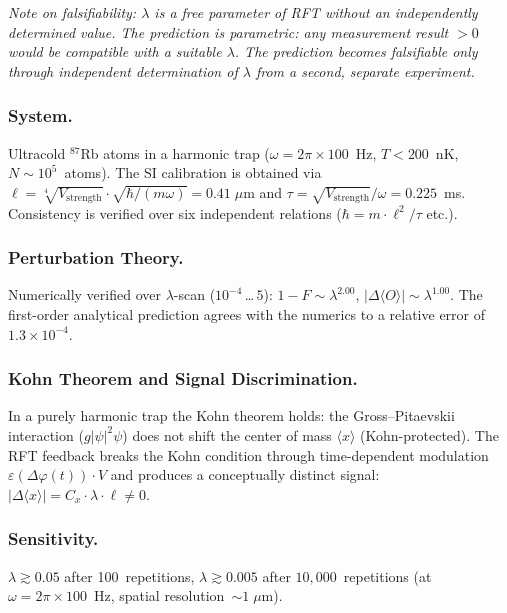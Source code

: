 \documentclass[12pt]{iopart}
\begin{document}
	\emph{Note on falsifiability: $\lambda$ is a free parameter
	of RFT without an independently determined value. The
	prediction is parametric: any measurement result $>0$
	would be compatible with a suitable $\lambda$. The prediction
	becomes falsifiable only through independent determination of
	$\lambda$ from a second, separate experiment.}
	
	\subsubsection{System.}
	
	Ultracold ${}^{87}$Rb atoms in a harmonic trap
	($\omega = 2\pi \times 100$~Hz, $T < 200$~nK,
	$N \sim 10^5$~atoms). The SI calibration is obtained via
	$\ell = \sqrt[4]{V_{\mathrm{strength}}} \cdot
	\sqrt{\hbar/(m\omega)} = 0.41\;\mu$m and
	$\tau = \sqrt{V_{\mathrm{strength}}} / \omega
	= 0.225$~ms.
	Consistency is verified over six independent
	relations ($\hbar = m \cdot \ell^2 / \tau$ etc.).
	
	\subsubsection{Perturbation Theory.}
	
	Numerically verified over $\lambda$-scan
	($10^{-4}$\,\ldots\,$5$):
	$1 - F \sim \lambda^{2.00}$,
	$|\Delta\langle O\rangle| \sim \lambda^{1.00}$.
	The first-order analytical prediction agrees with the
	numerics to a relative error of
	$1.3 \times 10^{-4}$.
	
	\subsubsection{Kohn Theorem and Signal Discrimination.}
	
	In a purely harmonic trap the Kohn theorem holds:
	the Gross--Pitaevskii interaction ($g|\psi|^2\psi$)
	does not shift the center of mass $\langle x\rangle$
	(Kohn-protected). The RFT feedback breaks the Kohn
	condition through time-dependent modulation
	$\varepsilon(\Delta\varphi(t)) \cdot V$ and produces
	a conceptually distinct signal:
	$|\Delta\langle x\rangle| = C_x \cdot \lambda \cdot
	\ell \neq 0$.
	
	\subsubsection{Sensitivity.}
	
	$\lambda \gtrsim 0.05$ after 100~repetitions,
	$\lambda \gtrsim 0.005$ after $10{,}000$~repetitions
	(at $\omega = 2\pi \times 100$~Hz, spatial
	resolution~${\sim}1\;\mu$m).
	
\end{document}
